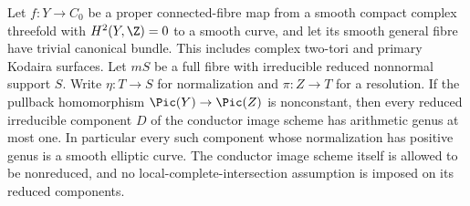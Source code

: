 
\begin{proposition}\label{cdp:st:A.5.12}
Let $f:Y\to C_0$ be a proper connected-fibre map from a
smooth compact complex threefold with $H^2(Y,\Z)=0$ to
a smooth curve, and let its smooth general fibre have
trivial canonical bundle. This includes complex
two-tori and primary Kodaira surfaces.
Let $mS$ be a full fibre with irreducible
reduced nonnormal support $S$. Write $\eta:T\to S$ for
normalization and $\pi:Z\to T$ for a resolution.
If the pullback homomorphism
$\Pic(Y)\to\Pic(Z)$ is nonconstant, then every reduced
irreducible component $D$ of the conductor image scheme
has arithmetic genus at most one.
In particular every such component whose normalization
has positive genus is a smooth elliptic curve.
The conductor image scheme itself is allowed to be
nonreduced, and no local-complete-intersection assumption
is imposed on its reduced components.
\end{proposition}
